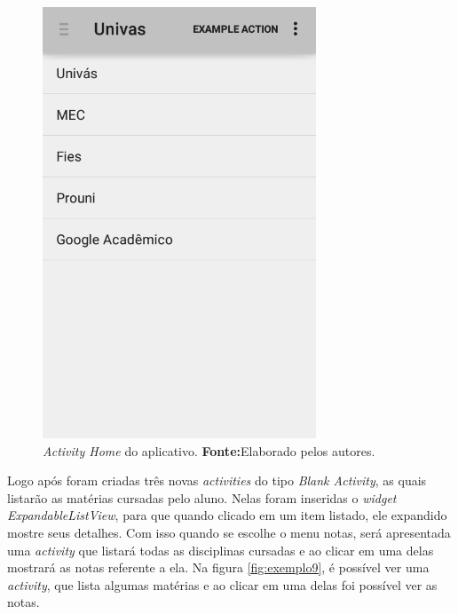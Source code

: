 	\begin{figure}[h!]
			\centerline{\includegraphics[scale=0.5]{./imagens/imagem8.png}}
			\caption[\textit{Activity Home} do aplicativo]{\textit{Activity Home} do aplicativo.
			 \textbf{Fonte:}Elaborado pelos autores.}
			\label{fig:exemplo8}
		\end{figure}
	
	\pagebreak	
	\par Logo após foram criadas três novas \textit{activities} do tipo
\textit{Blank Activity}, as quais listarão as matérias cursadas pelo aluno.
Nelas foram inseridas o \textit{widget ExpandableListView}, para que quando
clicado em um item listado, ele expandido mostre seus detalhes. Com isso quando
se escolhe o menu notas, será apresentada uma \textit{activity} que listará
todas as disciplinas cursadas e ao clicar em uma delas mostrará as notas
referente a ela. Na figura \ref{fig:exemplo9}, é possível ver uma
\textit{activity}, que lista algumas matérias e ao clicar em uma delas foi
possível ver as notas.
	
